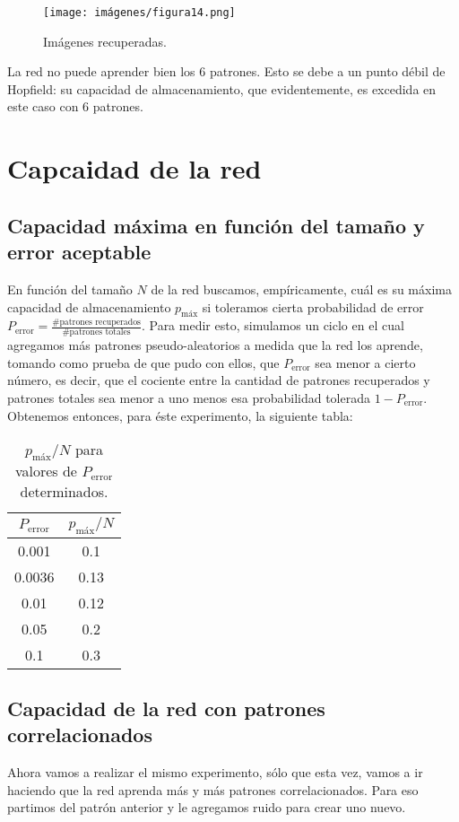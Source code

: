 \documentclass[a4paper,12pt]{article}
\begin{document}
\begin{figure}[!h]
    \centering
    \texttt{[image: imágenes/figura14.png]}
    \caption{Imágenes recuperadas.}
    \label{fig:figura14}
\end{figure}

La red no puede aprender bien los 6 patrones. Esto se debe a un punto débil de Hopfield: su capacidad de almacenamiento, que evidentemente, es excedida en este caso con 6 patrones.

\newpage
\section{Capcaidad de la red}
\subsection{Capacidad máxima en función del tamaño y error aceptable}
En función del tamaño $N$ de la red buscamos, empíricamente, cuál es su máxima capacidad de almacenamiento $p_{\text{máx}}$ si toleramos cierta probabilidad de error $P_{\text{error}} = \frac{\#\text{patrones recuperados}}{\#\text{patrones totales}}$.
Para medir esto, simulamos un ciclo en el cual agregamos más patrones pseudo-aleatorios a medida que la red los aprende, tomando como prueba de que pudo con ellos, que $P_{\text{error}}$ sea menor a cierto número, es decir, que el cociente entre la cantidad de patrones recuperados y patrones totales sea menor a uno menos esa probabilidad tolerada $1 - P_{\text{error}}$.
Obtenemos entonces, para éste experimento, la siguiente tabla:

\begin{table}[!h]
    \centering
    \begin{tabular}{|c|c|}
        \hline
        $P_{\text{error}}$ & $p_{\text{máx}} / N$ \\
        \hline
        0.001 & 0.1 \\
        \hline
        0.0036 & 0.13 \\
        \hline
        0.01 & 0.12 \\
        \hline
        0.05 & 0.2 \\
        \hline
        0.1 & 0.3 \\
        \hline
    \end{tabular}
    \caption{$p_{\text{máx}} / N$ para valores de $P_{\text{error}}$ determinados.}
    \label{tab:tabla1}
\end{table}

\subsection{Capacidad de la red con patrones correlacionados}
Ahora vamos a realizar el mismo experimento, sólo que esta vez, vamos a ir haciendo que la red aprenda más y más patrones correlacionados. Para eso partimos del patrón anterior y le agregamos ruido para crear uno nuevo.
\end{document}
